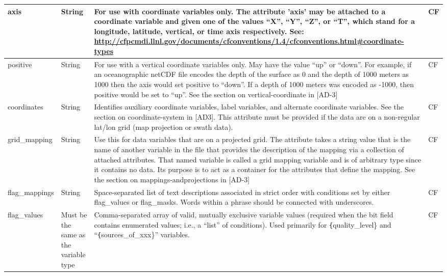 \begin{longtable}{|p{}|p{}|p{}|p{}|}
\rowcolor{LightCyan} axis & String & For use with coordinate variables only. The attribute 'axis' may be attached to a coordinate variable and given one of the values “X”, “Y”, “Z”, or “T”, which stand for a longitude, latitude, vertical, or time axis respectively. See: \url{http://cfpcmdi.llnl.gov/documents/cfconventions/1.4/cfconventions.html#coordinate-types} & CF \\ \hline

\rowcolor{LightCyan} positive & String & For use with a vertical coordinate variables
only. May have the value “up” or “down”. For
example, if an oceanographic netCDF file
encodes the depth of the surface as 0 and the
depth of 1000 meters as 1000 then the axis
would set positive to “down”. If a depth of
1000 meters was encoded as -1000, then
positive would be set to “up”. See the section
on vertical-coordinate in [AD-3] & CF \\ \hline

\rowcolor{LightCyan} coordinates & String & Identifies auxiliary coordinate variables, label variables, and alternate coordinate variables. See the section on coordinate-system in [AD3]. This attribute must be provided if the data are on a non-regular lat/lon grid (map projection or swath data). & CF \\ \hline

\rowcolor{LightCyan} grid\_mapping & String & Use this for data variables that are on a projected grid. The attribute takes a string value that is the name of another variable in the file that provides the description of the mapping via a collection of attached attributes. That named variable is called a grid mapping variable and is of arbitrary type since it contains no data. Its purpose is to act as a container for the attributes that define the mapping. See the section on mappings-andprojections in [AD-3] & CF \\ \hline

\rowcolor{LightCyan} flag\_mappings & String & Space-separated list of text descriptions associated in strict order with conditions set by either flag\_values or flag\_masks. Words within a phrase should be connected with underscores. & CF \\ \hline

\rowcolor{LightCyan} flag\_values & Must be the same as
the variable type & Comma-separated array of valid, mutually exclusive variable values (required when the bit field contains enumerated values; i.e., a “list” of conditions). Used primarily for \texttt\{quality\_level\} and “\texttt\{sources\_of\_xxx\}” variables. & CF \\ \hline


\end{longtable}
